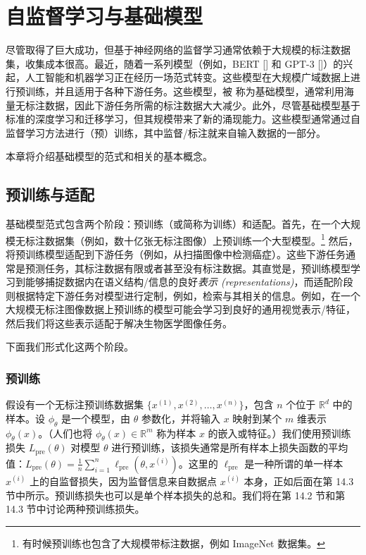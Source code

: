 \chapter{自监督学习与基础模型}

尽管取得了巨大成功，但基于神经网络的监督学习通常依赖于大规模的标注数据集，收集成本很高。最近，随着一系列模型（例如，BERT [\cite{devlin2019bert}] 和 GPT-3 [\cite{brown2020language}]）的兴起，人工智能和机器学习正在经历一场范式转变。这些模型在大规模广域数据上进行预训练，并且适用于各种下游任务。这些模型，被 \cite{bommasani2021opportunities} 称为基础模型，通常利用海量无标注数据，因此下游任务所需的标注数据大大减少。此外，尽管基础模型基于标准的深度学习和迁移学习，但其规模带来了新的涌现能力。这些模型通常通过自监督学习方法进行（预）训练，其中监督/标注就来自输入数据的一部分。

本章将介绍基础模型的范式和相关的基本概念。

\section{预训练与适配}\label{sec:14.1}

基础模型范式包含两个阶段：预训练（或简称为训练）和适配。首先，在一个大规模无标注数据集（例如，数十亿张无标注图像）上预训练一个大型模型。\footnote{有时候预训练也包含了大规模带标注数据，例如 ImageNet 数据集。} 然后，将预训练模型适配到下游任务（例如，从扫描图像中检测癌症）。这些下游任务通常是预测任务，其标注数据有限或者甚至没有标注数据。其直觉是，预训练模型学习到能够捕捉数据内在语义结构/信息的良好\textit{表示 (representations)}，而适配阶段则根据特定下游任务对模型进行定制，例如，检索与其相关的信息。例如，在一个大规模无标注图像数据上预训练的模型可能会学习到良好的通用视觉表示/特征，然后我们将这些表示适配于解决生物医学图像任务。

下面我们形式化这两个阶段。

\subsection*{预训练}

假设有一个无标注预训练数据集 $\{x^{(1)}, x^{(2)}, \dots, x^{(n)}\}$，包含 $n$ 个位于 $\mathbb{R}^d$ 中的样本。设 $\phi_\theta$ 是一个模型，由 $\theta$ 参数化，并将输入 $x$ 映射到某个 $m$ 维表示 $\phi_\theta(x)$。（人们也将 $\phi_\theta(x) \in \mathbb{R}^m$ 称为样本 $x$ 的嵌入或特征。）我们使用预训练损失 $L_{\text{pre}}(\theta)$ 对模型 $\theta$ 进行预训练，该损失通常是所有样本上损失函数的平均值：$L_{\text{pre}}(\theta) = \frac{1}{n} \sum_{i=1}^n \ell_{\text{pre}}(\theta, x^{(i)})$。这里的 $\ell_{\text{pre}}$ 是一种所谓的单一样本 $x^{(i)}$ 上的自监督损失，因为监督信息来自数据点 $x^{(i)}$ 本身，正如后面在第 14.3 节中所示。预训练损失也可以是单个样本损失的总和。我们将在第 14.2 节和第 14.3 节中讨论两种预训练损失。


